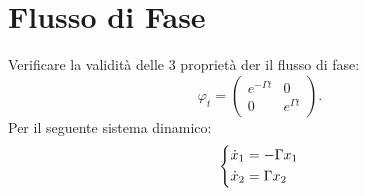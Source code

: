 \section{Flusso di Fase}%
\begin{ex}
    Verificare la validità delle 3 proprietà der il flusso di fase:
    \[
        \varphi_t = 
	\begin{pmatrix} 
	    e^{-\Gamma t} & 0 \\
	    0 & e^{\Gamma t} 
        \end{pmatrix} 
    .\] 
    Per il seguente sistema dinamico:
    \[
    \begin{dcases}
    \dot{x}_1 = - \Gamma x_1\\
    \dot{x}_2= \Gamma x_2
    \end{dcases}
    \]
\end{ex}
\noindent
